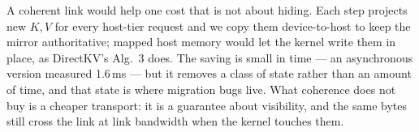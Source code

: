 A coherent link would help one cost that is not about hiding. Each step projects
new $K,V$ for every host-tier request and we copy them device-to-host to keep the
mirror authoritative; mapped host memory would let the kernel write them in
place, as DirectKV's Alg.~3 does. The saving is small in time --- an asynchronous
version measured 1.6\,ms --- but it removes a class of state rather than an
amount of time, and that state is where migration bugs live. What coherence does
not buy is a cheaper transport: it is a guarantee about visibility, and the same
bytes still cross the link at link bandwidth when the kernel touches them.

